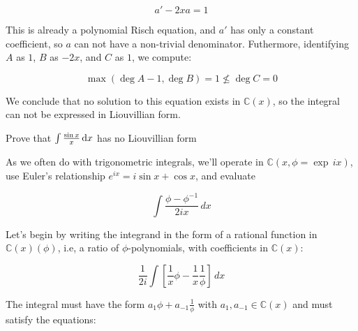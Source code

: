 $$a' - 2x a = 1$$

This is already a polynomial Risch equation, and $a'$ has only
a constant coefficient, so $a$ can not have a non-trivial denominator.
Futhermore, identifying $A$ as $1$, $B$ as $-2x$, and $C$ as $1$, we compute:

$$\max(\deg A - 1, \deg B) = 1 \nleq \deg C = 0$$

We conclude that no solution to this equation exists in ${\mathbb C}(x)$,
so the integral can not be expressed in Liouvillian form.

\endexample


\example Prove that $\int \frac{\sin x}{x} \, {\rm d}x$ has no Liouvillian form

As we often do with trigonometric integrals, we'll operate in
${\mathbb C}(x, \phi = \exp \,ix)$, use Euler's relationship
$e^{ix}=i\sin x + \cos x$, and evaluate

$$\int \frac{\phi - \phi^{-1}}{2ix} \,dx$$

Let's begin by writing the integrand in the form of a rational
function in ${\mathbb C}(x)(\phi)$, i.e, a ratio
of $\phi$-polynomials, with coefficients in ${\mathbb C}(x)$:

$$\frac{1}{2i} \int \left[ \frac{1}{x}\phi - \frac{1}{x}\frac{1}{\phi} \right]\,dx$$

\begin{comment}
We want to split the denominator into its normal and special
components, by factoring it into irreducible polynomials and
classifying each one as normal or special.  In this case, the
factoriziation is trivial, and we know from theorem \ref{basic
exponential properties} that $\phi$ is special.

Can we have any logarithms in our integral?  Let's see.
Any logarithm of a rational function can be factored and
split into separate logarithms using basic properties
of a logarithms:

$$\ln ab = \ln a + \ln b \qquad\qquad \ln\frac{a}{b} = \ln a - \ln b$$

So, we need only consider logarithms of irreducible polynomials.

Theorem \ref{basic exponential properties} also tells us that we can
have no normal polynomials in denominator of our integral,
\end{comment}


The integral must have the form $a_1 \phi + a_{-1} \frac{1}{\phi}$
with $a_1, a_{-1} \in {\mathbb C}(x)$ and must satisfy the equations:


